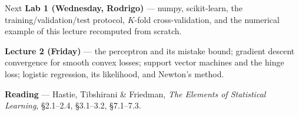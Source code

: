 \documentclass[11pt,aspectratio=169]{beamer}
\begin{document}
\begin{frame}{Next}
\textbf{Lab 1 (Wednesday, Rodrigo)} --- numpy, scikit-learn, the training/validation/test protocol,
$K$-fold cross-validation, and the numerical example of this lecture recomputed from scratch.
\vspace{8pt}

\textbf{Lecture 2 (Friday)} --- the perceptron and its mistake bound; gradient descent
convergence for smooth convex losses; support vector machines and the hinge loss; logistic regression,
its likelihood, and Newton's method.
\vspace{8pt}

\textbf{Reading} --- Hastie, Tibshirani \& Friedman, \emph{The Elements of Statistical Learning},
\S2.1--2.4, \S3.1--3.2, \S7.1--7.3.
\end{frame}
\end{document}
